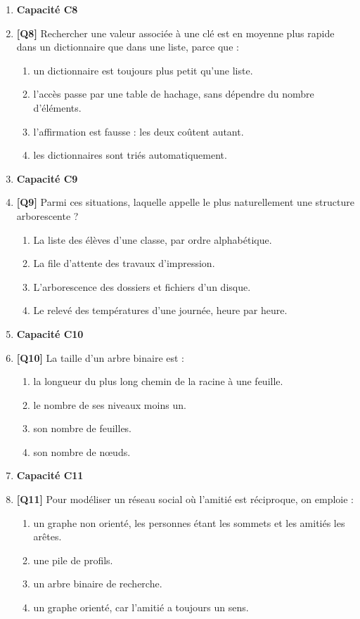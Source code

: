 \begin{enumerate}
\item[] \textbf{Capacité C8}

\item \textbf{[Q8]} Rechercher une valeur associée à une clé est en moyenne plus rapide dans un dictionnaire que dans une liste, parce que :
  \begin{enumerate}[label=\Alph*.]
    \item un dictionnaire est toujours plus petit qu'une liste.
    \item l'accès passe par une table de hachage, sans dépendre du nombre d'éléments.
    \item l'affirmation est fausse : les deux coûtent autant.
    \item les dictionnaires sont triés automatiquement.
  \end{enumerate}

\item[] \textbf{Capacité C9}

\item \textbf{[Q9]} Parmi ces situations, laquelle appelle le plus naturellement une structure arborescente ?
  \begin{enumerate}[label=\Alph*.]
    \item La liste des élèves d'une classe, par ordre alphabétique.
    \item La file d'attente des travaux d'impression.
    \item L'arborescence des dossiers et fichiers d'un disque.
    \item Le relevé des températures d'une journée, heure par heure.
  \end{enumerate}

\item[] \textbf{Capacité C10}

\item \textbf{[Q10]} La taille d'un arbre binaire est :
  \begin{enumerate}[label=\Alph*.]
    \item la longueur du plus long chemin de la racine à une feuille.
    \item le nombre de ses niveaux moins un.
    \item son nombre de feuilles.
    \item son nombre de nœuds.
  \end{enumerate}

\item[] \textbf{Capacité C11}

\item \textbf{[Q11]} Pour modéliser un réseau social où l'amitié est réciproque, on emploie :
  \begin{enumerate}[label=\Alph*.]
    \item un graphe non orienté, les personnes étant les sommets et les amitiés les arêtes.
    \item une pile de profils.
    \item un arbre binaire de recherche.
    \item un graphe orienté, car l'amitié a toujours un sens.
  \end{enumerate}


\end{enumerate}
